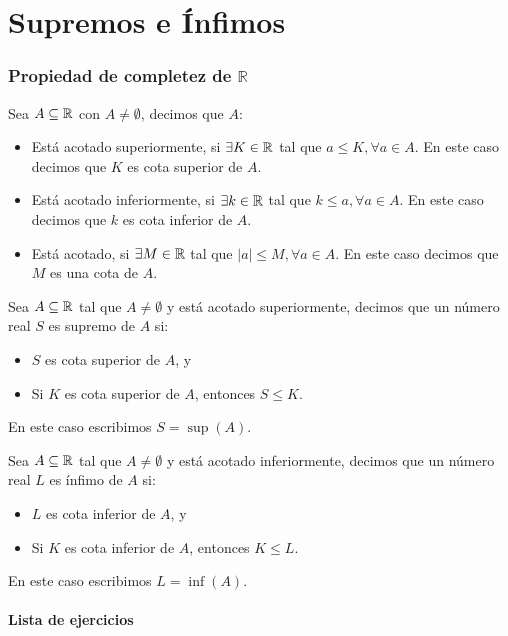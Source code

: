 \part*{Supremos e Ínfimos}

\section*{Propiedad de completez de \(\mathbb{R}\)}

 Sea $A\subseteq \mathbb{R}$ con $A\neq \emptyset$, decimos que $A$:
\begin{itemize}
 \item Está acotado superiormente, si $\exists K\in \mathbb{R}$ tal que $a \leq K, \forall a\in A$. En este caso decimos que $K$ es cota superior de $A$.

 \item Está acotado inferiormente, si $\exists k\in \mathbb{R}$ tal que $k \leq a, \forall a\in A$. En este caso decimos que $k$ es cota inferior de $A$.

 \item Está acotado, si $\exists M\in \mathbb{R}$ tal que $|a|\leq M,\forall a \in A$. En este caso decimos que $M$ es una cota de $A$.
\end{itemize}

  Sea $A\subseteq \mathbb{R}$ tal que $A\neq \emptyset$ y está acotado superiormente, decimos que un número real $S$ es supremo de $A$ si:
\begin{itemize}
 \item $S$ es cota superior de $A$, y
 \item Si $K$ es cota superior de $A$, entonces $S\leq K$.%
\end{itemize}

En este caso escribimos $S=\sup(A)$.

 Sea $A\subseteq \mathbb{R}$ tal que $A\neq \emptyset$ y está acotado inferiormente, decimos que un número real $L$ es ínfimo de $A$ si: \begin{itemize}
 \item $L$ es cota inferior de $A$, y
 \item Si $K$ es cota inferior de $A$, entonces $K\leq L$.
\end{itemize}

En este caso escribimos $L=\inf(A)$.

\subsection*{Lista de ejercicios}

